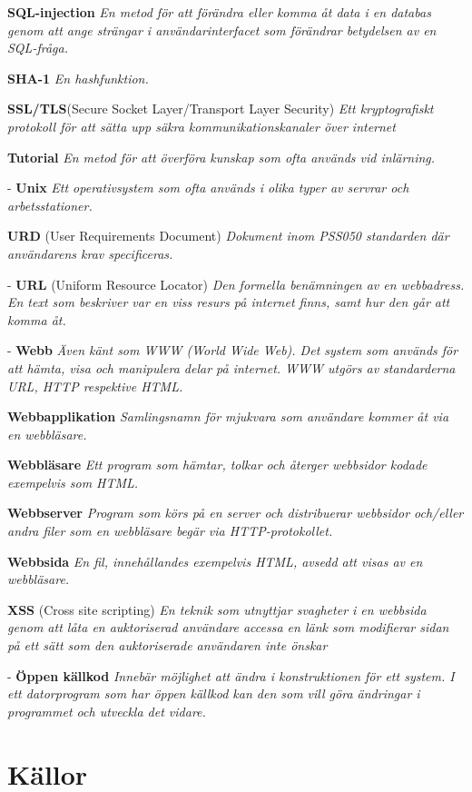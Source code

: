 \documentclass[a4paper, twoside, 11pt, titlepage]{article}
\begin{document}
\textbf{SQL-injection} \emph{En metod för att förändra eller komma åt data i en databas genom att ange strängar i användarinterfacet som förändrar betydelsen av en SQL-fråga.}

\textbf{SHA-1} \emph{En hashfunktion.}

\textbf{SSL/TLS}(Secure Socket Layer/Transport Layer Security) \emph{Ett kryptografiskt protokoll för att sätta upp säkra kommunikationskanaler över internet}

\textbf{Tutorial} \emph{En metod för att överföra kunskap som ofta används vid inlärning.}

- \textbf{Unix} \emph{Ett operativsystem som ofta används i olika typer av servrar och arbetsstationer.}

\textbf{URD} (User Requirements Document) \emph{Dokument inom PSS050 standarden där användarens krav specificeras.}

- \textbf{URL} (Uniform Resource Locator) \emph{Den formella benämningen av en webbadress. En text som beskriver var en viss resurs på internet finns, samt hur den går att komma åt.}

- \textbf{Webb} \emph{Även känt som WWW (World Wide Web). Det system som används för att hämta, visa och manipulera delar på internet. WWW utgörs av standarderna URL, HTTP respektive HTML.}

\textbf{Webbapplikation} \emph{Samlingsnamn för mjukvara som användare kommer åt via en webbläsare.}

\textbf{Webbläsare} \emph{Ett program som hämtar, tolkar och återger webbsidor kodade exempelvis som HTML.}

\textbf{Webbserver} \emph{Program som körs på en server och distribuerar webbsidor och/eller andra filer som en webbläsare begär via HTTP-protokollet.}

\textbf{Webbsida} \emph{En fil, innehållandes exempelvis HTML, avsedd att visas av en webbläsare.}

\textbf{XSS} (Cross site scripting) \emph{En teknik som utnyttjar svagheter i en webbsida genom att låta en auktoriserad användare accessa en länk som modifierar sidan på ett sätt som den auktoriserade användaren inte önskar}

- \textbf{Öppen källkod} \emph{Innebär möjlighet att ändra i konstruktionen för ett system. I ett datorprogram som har öppen källkod kan den som vill göra ändringar i programmet och utveckla det vidare.}

\clearpage
\section{Källor}
\end{document}
